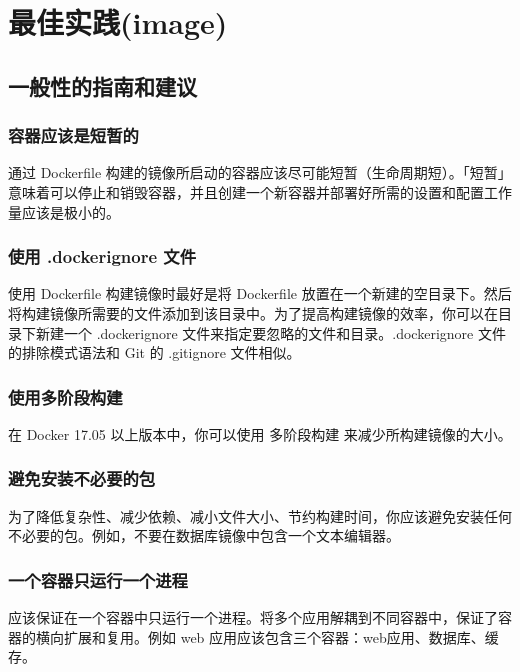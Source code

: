 \documentclass[letterpaper,10pt,english]{sphinxmanual}
\begin{document}
\section{最佳实践(image)}
\label{\detokenize{docker/appendix:image}}

\subsection{一般性的指南和建议}
\label{\detokenize{docker/appendix:id3}}

\subsubsection{容器应该是短暂的}
\label{\detokenize{docker/appendix:id4}}
通过 Dockerfile 构建的镜像所启动的容器应该尽可能短暂（生命周期短）。「短暂」意味着可以停止和销毁容器，并且创建一个新容器并部署好所需的设置和配置工作量应该是极小的。


\subsubsection{使用 .dockerignore 文件}
\label{\detokenize{docker/appendix:dockerignore}}
使用 Dockerfile 构建镜像时最好是将 Dockerfile 放置在一个新建的空目录下。然后将构建镜像所需要的文件添加到该目录中。为了提高构建镜像的效率，你可以在目录下新建一个 .dockerignore 文件来指定要忽略的文件和目录。.dockerignore 文件的排除模式语法和 Git 的 .gitignore 文件相似。


\subsubsection{使用多阶段构建}
\label{\detokenize{docker/appendix:id5}}
在 Docker 17.05 以上版本中，你可以使用 多阶段构建 来减少所构建镜像的大小。


\subsubsection{避免安装不必要的包}
\label{\detokenize{docker/appendix:id6}}
为了降低复杂性、减少依赖、减小文件大小、节约构建时间，你应该避免安装任何不必要的包。例如，不要在数据库镜像中包含一个文本编辑器。


\subsubsection{一个容器只运行一个进程}
\label{\detokenize{docker/appendix:id7}}
应该保证在一个容器中只运行一个进程。将多个应用解耦到不同容器中，保证了容器的横向扩展和复用。例如 web 应用应该包含三个容器：web应用、数据库、缓存。
\end{document}
